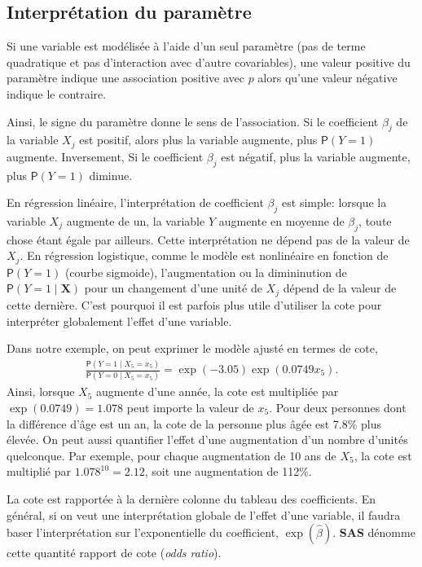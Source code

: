\documentclass[
  11pt,
  letterpaper,
]{book}
\theoremstyle{definition}
\theoremstyle{definition}
\theoremstyle{definition}
\theoremstyle{remark}
\begin{document}
\hypertarget{interpruxe9tation-du-paramuxe8tre}{%
\subsection{Interprétation du paramètre}\label{interpruxe9tation-du-paramuxe8tre}}

Si une variable est modélisée à l'aide d'un seul paramètre (pas de terme quadratique et pas d'interaction avec d'autre covariables), une valeur positive du paramètre indique une association positive avec \(p\) alors qu'une valeur négative indique le contraire.

Ainsi, le signe du paramètre donne le sens de l'association. Si le coefficient \(\beta_j\) de la variable \(X_j\) est positif, alors plus la variable augmente, plus \({\mathsf P}\left(Y=1\right)\) augmente. Inversement, Si le coefficient \(\beta_j\) est négatif, plus la variable augmente, plus \({\mathsf P}\left(Y=1\right)\) diminue.

En régression linéaire, l'interprétation de coefficient \(\beta_j\) est simple: lorsque la variable \(X_j\) augmente de un, la variable \(Y\) augmente en moyenne de \(\beta_j\), toute chose étant égale par ailleurs. Cette interprétation ne dépend pas de la valeur de \(X_j\). En régression logistique, comme le modèle est nonlinéaire en fonction de \({\mathsf P}\left(Y=1\right)\) (courbe sigmoide), l'augmentation ou la dimininution de \({\mathsf P}\left(Y=1\mid \boldsymbol{X}\right)\) pour un changement d'une unité de \(X_j\) dépend de la valeur de cette dernière. C'est pourquoi il est parfois plus utile d'utiliser la cote pour interpréter globalement l'effet d'une variable.

Dans notre exemple, on peut exprimer le modèle ajusté en termes de cote,
\begin{align*}
 \frac{{\mathsf P}\left(Y=1 \mid X_5=x_5\right)}{{\mathsf P}\left(Y=0 \mid X_5=x_5\right)} = \exp(-3.05)\exp(0.0749x_5).
\end{align*}
Ainsi, lorsque \(X_5\) augmente d'une année, la cote est multipliée par \(\exp(0.0749) = 1.078\) peut importe la valeur de \(x_5\). Pour deux personnes dont la différence d'âge est un an, la cote de la personne plus âgée est 7.8\% plus élevée. On peut aussi quantifier l'effet d'une augmentation d'un nombre d'unités quelconque. Par exemple, pour chaque augmentation de 10 ans de \(X_5\), la cote est multiplié par \(1.078^{10} = 2.12\), soit une augmentation de 112\%.

La cote est rapportée à la dernière colonne du tableau des coefficients. En général, si on veut une interprétation globale de l'effet d'une variable, il faudra baser l'interprétation sur l'exponentielle du coefficient, \(\exp(\widehat{\beta})\). \textbf{SAS} dénomme cette quantité rapport de cote (\emph{odds ratio}).
\end{document}
